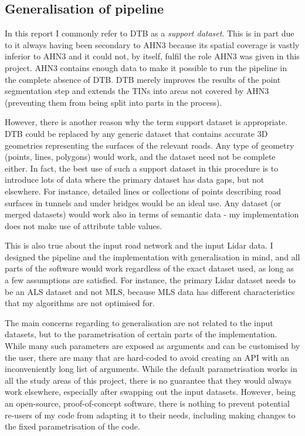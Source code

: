 \subsection{Generalisation of pipeline}
\label{sub:m_generalisation}

In this report I commonly refer to DTB as a \textit{support dataset}. This is in part due to it always having been secondary to AHN3 because its spatial coverage is vastly inferior to AHN3 and it could not, by itself, fulfil the role AHN3 was given in this project. AHN3 contains enough data to make it possible to run the pipeline in the complete absence of DTB. DTB merely improves the results of the point segmentation step and extends the TINs into areas not covered by AHN3 (preventing them from being split into parts in the process).

However, there is another reason why the term support dataset is appropriate. DTB could be replaced by any generic dataset that contains accurate 3D geometries representing the surfaces of the relevant roads. Any type of geometry (points, lines, polygons) would work, and the dataset need not be complete either. In fact, the best use of such a support dataset in this procedure is to introduce lots of data where the primary dataset has data gaps, but not elsewhere. For instance, detailed lines or collections of points describing road surfaces in tunnels and under bridges would be an ideal use. Any dataset (or merged datasets) would work also in terms of semantic data - my implementation does not make use of attribute table values.

This is also true about the input road network and the input Lidar data. I designed the pipeline and the implementation with generalisation in mind, and all parts of the software would work regardless of the exact dataset used, as long as a few assumptions are satisfied. For instance, the primary Lidar dataset needs to be an ALS dataset and not MLS, because MLS data has different characteristics that my algorithms are not optimised for.

The main concerns regarding to generalisation are not related to the input datasets, but to the parametrisation of certain parts of the implementation. While many such parameters are exposed as arguments and can be customised by the user, there are many that are hard-coded to avoid creating an API with an inconveniently long list of arguments. While the default parametrisation works in all the study areas of this project, there is no guarantee that they would always work elsewhere, especially after swapping out the input datasets. However, being an open-source, proof-of-concept software, there is nothing to prevent potential re-users of my code from adapting it to their needs, including making changes to the fixed parametrisation of the code.

